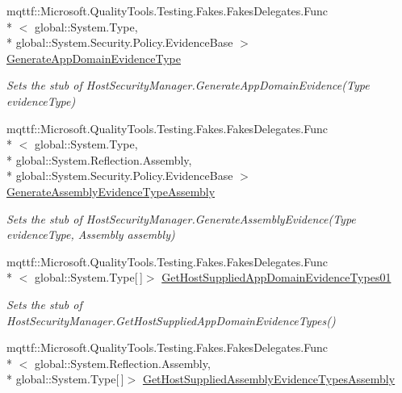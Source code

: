 \begin{DoxyCompactItemize}
mqttf\-::\-Microsoft.\-Quality\-Tools.\-Testing.\-Fakes.\-Fakes\-Delegates.\-Func\\*
$<$ global\-::\-System.\-Type, \\*
global\-::\-System.\-Security.\-Policy.\-Evidence\-Base $>$ \hyperlink{class_system_1_1_security_1_1_fakes_1_1_stub_host_security_manager_a4e2e0b2835efa9fdf61ba91af1927a30}{Generate\-App\-Domain\-Evidence\-Type}
\begin{DoxyCompactList}\small\item\em Sets the stub of Host\-Security\-Manager.\-Generate\-App\-Domain\-Evidence(\-Type evidence\-Type)\end{DoxyCompactList}\item 
mqttf\-::\-Microsoft.\-Quality\-Tools.\-Testing.\-Fakes.\-Fakes\-Delegates.\-Func\\*
$<$ global\-::\-System.\-Type, \\*
global\-::\-System.\-Reflection.\-Assembly, \\*
global\-::\-System.\-Security.\-Policy.\-Evidence\-Base $>$ \hyperlink{class_system_1_1_security_1_1_fakes_1_1_stub_host_security_manager_ab61b5e39c9dbfff17a68a597c1768358}{Generate\-Assembly\-Evidence\-Type\-Assembly}
\begin{DoxyCompactList}\small\item\em Sets the stub of Host\-Security\-Manager.\-Generate\-Assembly\-Evidence(\-Type evidence\-Type, Assembly assembly)\end{DoxyCompactList}\item 
mqttf\-::\-Microsoft.\-Quality\-Tools.\-Testing.\-Fakes.\-Fakes\-Delegates.\-Func\\*
$<$ global\-::\-System.\-Type\mbox{[}$\,$\mbox{]}$>$ \hyperlink{class_system_1_1_security_1_1_fakes_1_1_stub_host_security_manager_af629183711a0636a6cd6bbbb407f1fef}{Get\-Host\-Supplied\-App\-Domain\-Evidence\-Types01}
\begin{DoxyCompactList}\small\item\em Sets the stub of Host\-Security\-Manager.\-Get\-Host\-Supplied\-App\-Domain\-Evidence\-Types()\end{DoxyCompactList}\item 
mqttf\-::\-Microsoft.\-Quality\-Tools.\-Testing.\-Fakes.\-Fakes\-Delegates.\-Func\\*
$<$ global\-::\-System.\-Reflection.\-Assembly, \\*
global\-::\-System.\-Type\mbox{[}$\,$\mbox{]}$>$ \hyperlink{class_system_1_1_security_1_1_fakes_1_1_stub_host_security_manager_ad73a3e7cc9e430119b42b1c239849c07}{Get\-Host\-Supplied\-Assembly\-Evidence\-Types\-Assembly}

\end{DoxyCompactItemize}
